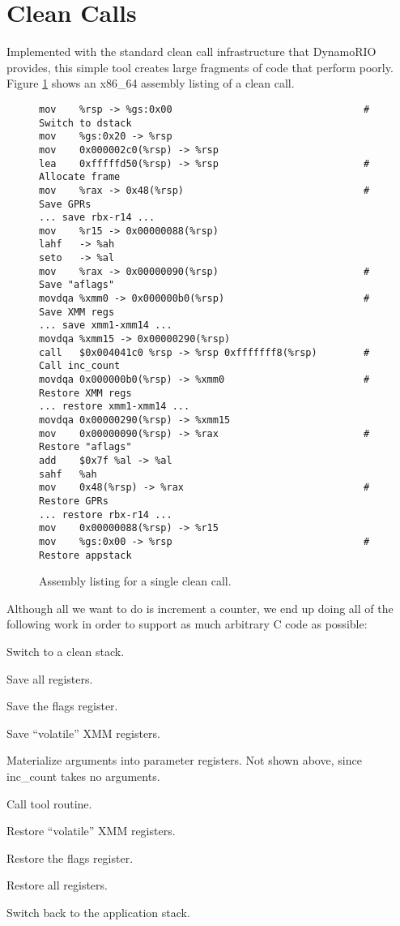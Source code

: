 \section{Clean Calls}
\label{sec:clean_calls}

Implemented with the standard clean call infrastructure that DynamoRIO provides,
this simple tool creates large fragments of code that perform poorly.  Figure
\ref{fig:clean_call} shows an x86\_64 assembly listing of a clean call.

\begin{figure}
\begin{verbatim}
mov    %rsp -> %gs:0x00                                 # Switch to dstack
mov    %gs:0x20 -> %rsp
mov    0x000002c0(%rsp) -> %rsp
lea    0xfffffd50(%rsp) -> %rsp                         # Allocate frame
mov    %rax -> 0x48(%rsp)                               # Save GPRs
... save rbx-r14 ...
mov    %r15 -> 0x00000088(%rsp)
lahf   -> %ah
seto   -> %al
mov    %rax -> 0x00000090(%rsp)                         # Save "aflags"
movdqa %xmm0 -> 0x000000b0(%rsp)                        # Save XMM regs
... save xmm1-xmm14 ...
movdqa %xmm15 -> 0x00000290(%rsp)
call   $0x004041c0 %rsp -> %rsp 0xfffffff8(%rsp)        # Call inc_count
movdqa 0x000000b0(%rsp) -> %xmm0                        # Restore XMM regs
... restore xmm1-xmm14 ...
movdqa 0x00000290(%rsp) -> %xmm15
mov    0x00000090(%rsp) -> %rax                         # Restore "aflags"
add    $0x7f %al -> %al
sahf   %ah
mov    0x48(%rsp) -> %rax                               # Restore GPRs
... restore rbx-r14 ...
mov    0x00000088(%rsp) -> %r15
mov    %gs:0x00 -> %rsp                                 # Restore appstack
\end{verbatim}
\caption{Assembly listing for a single clean call.}
\label{fig:clean_call}
\end{figure}

Although all we want to do is increment a counter, we end up doing all of the
following work in order to support as much arbitrary C code as possible:

\begin{packed_enumerate}
\item Switch to a clean stack.
\item Save all registers.
\item Save the flags register.
\item Save ``volatile'' XMM registers.
\item Materialize arguments into parameter registers.  Not shown above, since
inc\_count takes no arguments.
\item Call tool routine.
\item Restore ``volatile'' XMM registers.
\item Restore the flags register.
\item Restore all registers.
\item Switch back to the application stack.
\end{packed_enumerate}

